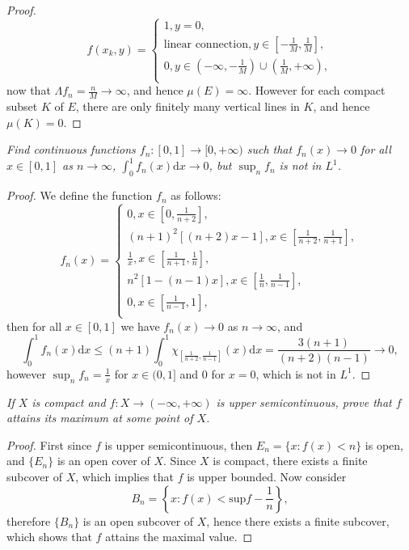 \begin{proof}
$$
f\left( x_k,y \right) =\begin{cases}
	1,y=0,\\
	\text{linear connection},y\in \left[ -\frac{1}{M},\frac{1}{M} \right] ,\\
	0,y\in \left( -\infty ,-\frac{1}{M} \right) \cup \left( \frac{1}{M},+\infty \right) ,\\
\end{cases}
$$
now that $\Lambda f_n=\frac{n}{M}\to\infty$, and hence $\mu(E)=\infty$. However for each compact subset $K$ of $E$, there are only finitely many vertical lines in $K$, and hence $\mu(K)=0$.
\end{proof}
\begin{problem}\em
Find continuous functions $f_n:[0,1]\to[0,+\infty)$ such that $f_n(x)\to 0$ for all $x\in[0,1]$ as $n\to\infty$, $\int_0^1f_n(x)\mathrm{d}x\to 0$, but $\sup_nf_n$ is not in $L^1$.
\end{problem}
\begin{proof}
We define the function $f_n$ as follows:
$$
f_n\left( x \right) =\begin{cases}
	0,x\in \left[ 0,\frac{1}{n+2} \right] ,\\
	\left( n+1 \right) ^2\left[ \left( n+2 \right) x-1 \right] ,x\in \left[ \frac{1}{n+2},\frac{1}{n+1} \right] ,\\
	\frac{1}{x},x\in \left[ \frac{1}{n+1},\frac{1}{n} \right] ,\\
	n^2\left[ 1-\left( n-1 \right) x \right] ,x\in \left[ \frac{1}{n},\frac{1}{n-1} \right] ,\\
	0,x\in \left[ \frac{1}{n-1},1 \right] ,\\
\end{cases}
$$
then for all $x\in[0,1]$ we have $f_n(x)\to 0$ as $n\to\infty$, and 
$$
\int_0^1{f_n\left( x \right) \mathrm{d}x}\le \left( n+1 \right) \int_0^1{\chi _{\left[ \frac{1}{n+2},\frac{1}{n-1} \right]}\left( x \right) \mathrm{d}x}=\frac{3\left( n+1 \right)}{\left( n+2 \right) \left( n-1 \right)}\rightarrow 0,
$$
however $\sup_nf_n=\frac{1}{x}$ for $x\in(0,1]$ and $0$ for $x=0$, which is not in $L^1$.
\end{proof}
\begin{problem}\em
If $X$ is compact and $f:X\to(-\infty,+\infty)$ is upper semicontinuous, prove that $f$ attains its maximum at some point of $X$.
\end{problem}
\begin{proof}
First since $f$ is upper semicontinuous, then $E_n=\{x:f(x)<n\}$ is open, and $\{E_n\}$ is an open cover of $X$. Since $X$ is compact, there exists a finite subcover of $X$, which implies that $f$ is upper bounded. Now consider 
$$
B_n=\left\{ x:f\left( x \right) <\mathrm{sup}f-\frac{1}{n} \right\} ,
$$
therefore $\{B_n\}$ is an open subcover of $X$, hence there exists a finite subcover, which shows that $f$ attains the maximal value.
\end{proof}
